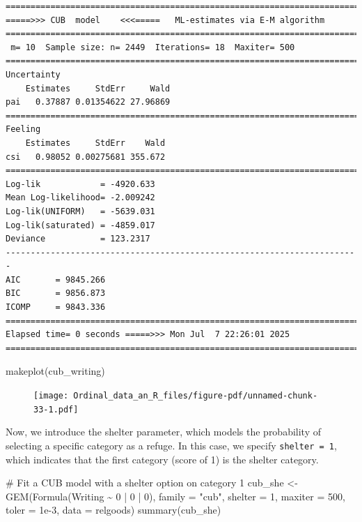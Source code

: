 \documentclass[
  letterpaper,
  DIV=11,
  numbers=noendperiod]{scrartcl}
\newenvironment{Shaded}{\begin{snugshade}}{\end{snugshade}}
\newcommand{\AttributeTok}[1]{\textcolor[rgb]{0.40,0.45,0.13}{#1}}
\newcommand{\CommentTok}[1]{\textcolor[rgb]{0.37,0.37,0.37}{#1}}
\newcommand{\DecValTok}[1]{\textcolor[rgb]{0.68,0.00,0.00}{#1}}
\newcommand{\FloatTok}[1]{\textcolor[rgb]{0.68,0.00,0.00}{#1}}
\newcommand{\FunctionTok}[1]{\textcolor[rgb]{0.28,0.35,0.67}{#1}}
\newcommand{\NormalTok}[1]{\textcolor[rgb]{0.00,0.23,0.31}{#1}}
\newcommand{\OtherTok}[1]{\textcolor[rgb]{0.00,0.23,0.31}{#1}}
\newcommand{\SpecialCharTok}[1]{\textcolor[rgb]{0.37,0.37,0.37}{#1}}
\newcommand{\StringTok}[1]{\textcolor[rgb]{0.13,0.47,0.30}{#1}}
\begin{document}
\begin{verbatim}
======================================================================= 
=====>>> CUB  model    <<<=====   ML-estimates via E-M algorithm   
======================================================================= 
 m= 10  Sample size: n= 2449  Iterations= 18  Maxiter= 500 
======================================================================= 
Uncertainty                                            
    Estimates     StdErr     Wald
pai   0.37887 0.01354622 27.96869
======================================================================= 
Feeling                                            
    Estimates     StdErr    Wald
csi   0.98052 0.00275681 355.672
======================================================================= 
Log-lik            = -4920.633 
Mean Log-likelihood= -2.009242 
Log-lik(UNIFORM)   = -5639.031 
Log-lik(saturated) = -4859.017 
Deviance           = 123.2317 
----------------------------------------------------------------------- 
AIC       = 9845.266 
BIC       = 9856.873 
ICOMP     = 9843.336 
======================================================================= 
Elapsed time= 0 seconds =====>>> Mon Jul  7 22:26:01 2025 
======================================================================= 
\end{verbatim}

\begin{Shaded}
\begin{Highlighting}[]
\FunctionTok{makeplot}\NormalTok{(cub\_writing)}
\end{Highlighting}
\end{Shaded}

\begin{figure}[H]

{\centering \texttt{[image: Ordinal\_data\_an\_R\_files/figure-pdf/unnamed-chunk-33-1.pdf]}

}

\end{figure}

Now, we introduce the shelter parameter, which models the probability of
selecting a specific category as a refuge. In this case, we specify
\texttt{shelter\ =\ 1}, which indicates that the first category (score
of 1) is the shelter category.

\begin{Shaded}
\begin{Highlighting}[]
\CommentTok{\# Fit a CUB model with a shelter option on category 1}
\NormalTok{cub\_she }\OtherTok{\textless{}{-}} \FunctionTok{GEM}\NormalTok{(}\FunctionTok{Formula}\NormalTok{(Writing }\SpecialCharTok{\textasciitilde{}} \DecValTok{0} \SpecialCharTok{|} \DecValTok{0} \SpecialCharTok{|} \DecValTok{0}\NormalTok{), }\AttributeTok{family =} \StringTok{"cub"}\NormalTok{, }\AttributeTok{shelter =} \DecValTok{1}\NormalTok{,}
               \AttributeTok{maxiter =} \DecValTok{500}\NormalTok{, }\AttributeTok{toler =} \FloatTok{1e{-}3}\NormalTok{, }\AttributeTok{data =}\NormalTok{ relgoods)}
\FunctionTok{summary}\NormalTok{(cub\_she)}
\end{Highlighting}
\end{Shaded}
\end{document}
